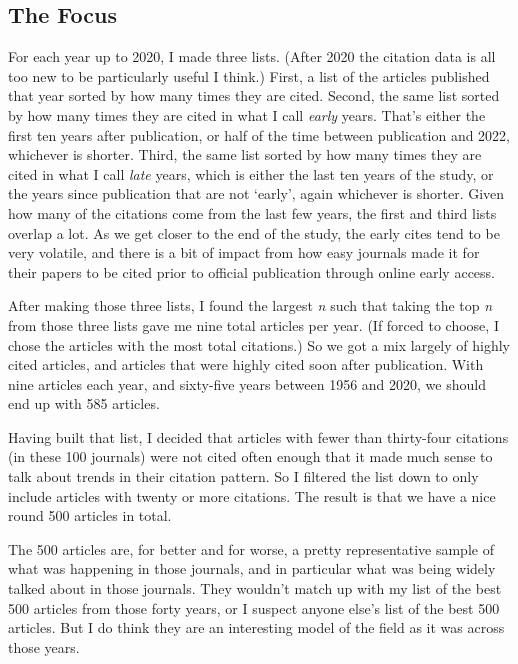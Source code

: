 \documentclass[
  10pt,
  letterpaper,
  DIV=11,
  numbers=noendperiod,
  twoside]{scrartcl}
\begin{document}
\subsection{The Focus}\label{sec-focus}

For each year up to 2020, I made three lists. (After 2020 the citation
data is all too new to be particularly useful I think.) First, a list of
the articles published that year sorted by how many times they are
cited. Second, the same list sorted by how many times they are cited in
what I call \emph{early} years. That's either the first ten years after
publication, or half of the time between publication and 2022, whichever
is shorter. Third, the same list sorted by how many times they are cited
in what I call \emph{late} years, which is either the last ten years of
the study, or the years since publication that are not `early', again
whichever is shorter. Given how many of the citations come from the last
few years, the first and third lists overlap a lot. As we get closer to
the end of the study, the early cites tend to be very volatile, and
there is a bit of impact from how easy journals made it for their papers
to be cited prior to official publication through online early access.

After making those three lists, I found the largest \emph{n} such that
taking the top \emph{n} from those three lists gave me nine total
articles per year. (If forced to choose, I chose the articles with the
most total citations.) So we got a mix largely of highly cited articles,
and articles that were highly cited soon after publication. With nine
articles each year, and sixty-five years between 1956 and 2020, we
should end up with 585 articles.

Having built that list, I decided that articles with fewer than
thirty-four citations (in these 100 journals) were not cited often
enough that it made much sense to talk about trends in their citation
pattern. So I filtered the list down to only include articles with
twenty or more citations. The result is that we have a nice round 500
articles in total.

The 500 articles are, for better and for worse, a pretty representative
sample of what was happening in those journals, and in particular what
was being widely talked about in those journals. They wouldn't match up
with my list of the best 500 articles from those forty years, or I
suspect anyone else's list of the best 500 articles. But I do think they
are an interesting model of the field as it was across those years.
\end{document}
